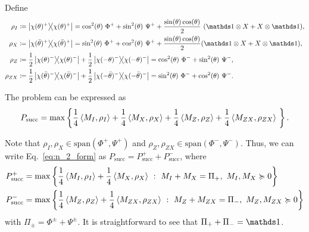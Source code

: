 Define
\begin{equation*}
    \begin{aligned}
        \rho_I &\coloneqq \ketbra{\chi(\theta)^+} = \cos^2(\theta)\ \Phi^+ + \sin^2(\theta)\ \Psi^+ + \frac{\sin(\theta)\cos(\theta)}{2}\ (\id \otimes X + X \otimes \id), \\
        \rho_X &\coloneqq \ketbra{\chi(\bar\theta)^+} = \sin^2(\theta)\ \Phi^+ + \cos^2(\theta)\ \Psi^+ + \frac{\sin(\theta)\cos(\theta)}{2} (\id \otimes X + X \otimes \id), \\
        \rho_Z &\coloneqq \frac{1}{2} \ketbra{\chi(\theta)^-} + \frac{1}{2} \ketbra{\chi(-\theta)^-} = \cos^2(\theta)\ \Phi^- + \sin^2(\theta)\ \Psi^-, \\
        \rho_{ZX} &\coloneqq \frac{1}{2} \ketbra{\chi(\bar{\theta})^-} + \frac{1}{2} \ketbra{\chi(-\bar{\theta})^-} = \sin^2(\theta)\ \Phi^- + \cos^2(\theta)\ \Psi^-.
    \end{aligned}
\end{equation*}

The problem can be expressed as
\begin{equation}
    \label{eq:n_2_form}
    \begin{aligned}
        P_{\mathrm{succ}} = \max \left\{ \frac{1}{4} \left\langle M_I, \rho_I \right\rangle + \frac{1}{4} \left\langle M_X, \rho_X \right\rangle + \frac{1}{4} \left\langle M_Z, \rho_Z \right\rangle + \frac{1}{4} \left\langle M_{ZX}, \rho_{ZX} \right\rangle\ \right\}.
    \end{aligned}
\end{equation}

Note that $\rho_I, \rho_X \in \mathrm{span}(\Phi^+, \Psi^+)$ and $\rho_Z,\rho_{ZX} \in \mathrm{span}(\Phi^-, \Psi^-)$.
Thus, we can write Eq.~\eqref{eq:n_2_form} as $P_{\mathrm{succ}} = P_{\mathrm{succ}}^+ + P_{\mathrm{succ}}^-$, where 
\begin{equation*}
    \label{eq:n_2_div}
    \begin{aligned}
        P_{\mathrm{succ}}^+ &= \max \left\{ \frac{1}{4} \left\langle M_I, \rho_I \right\rangle + \frac{1}{4} \left\langle M_X, \rho_X \right\rangle\ :\ M_I + M_X = \Pi_+,\ M_I, M_X \succcurlyeq 0 \right\} \\
        P_{\mathrm{succ}}^- &= \max \left\{ \frac{1}{4} \left\langle M_Z, \rho_Z \right\rangle + \frac{1}{4} \left\langle M_{ZX}, \rho_{ZX} \right\rangle\ :\ M_Z + M_{ZX} = \Pi_-,\ M_Z, M_{ZX} \succcurlyeq 0 \right\}
    \end{aligned}
\end{equation*}
with $\Pi_\pm = \Phi^\pm + \Psi^\pm$.
It is straightforward to see that $\Pi_+ + \Pi_- = \id$.

